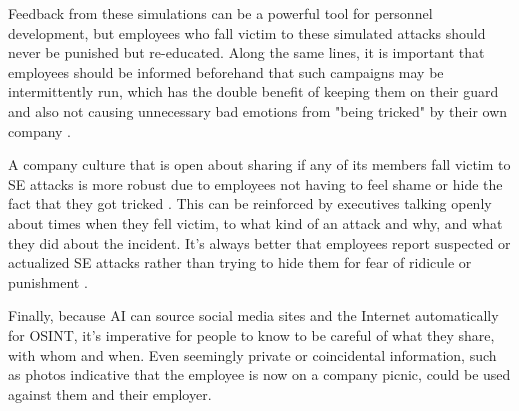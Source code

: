 Feedback from these simulations can be a powerful tool for personnel development, but employees who fall victim to these simulated attacks should never be punished but re-educated. Along the same lines, it is important that employees should be informed beforehand that such campaigns may be intermittently run, which has the double benefit of keeping them on their guard and also not causing unnecessary bad emotions from "being tricked" by their own company \citep{hadnagySocialEngineering2018, mitnickArtDeceptionControlling2003}.

A company culture that is open about sharing if any of its members fall victim to SE attacks is more robust due to employees not having to feel shame or hide the fact that they got tricked \citep{hadnagySocialEngineering2018}. This can be reinforced by executives talking openly about times when they fell victim, to what kind of an attack and why, and what they did about the incident. It's always better that employees report suspected or actualized SE attacks rather than trying to hide them for fear of ridicule or punishment \citep{mitnickArtDeceptionControlling2003}.


Finally, because AI can source social media sites and the Internet automatically for OSINT, it's imperative for people to know to be careful of what they share, with whom and when. Even seemingly private or coincidental information, such as photos indicative that the employee is now on a company picnic, could be used against them and their employer.




